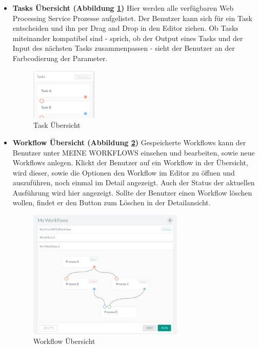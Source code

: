 \begin{itemize}
            \item \textbf{Tasks Übersicht (Abbildung \ref{fig:Tasks_Uebersicht})} \newline
            Hier werden alle verfügbaren \Gls{Web Processing Service} Prozesse aufgelistet. Der Benutzer kann sich für ein Task entscheiden und ihn per \Gls{Drag and Drop} in den Editor ziehen. Ob Tasks miteinander kompatibel sind - sprich, ob der Output eines Tasks und der Input des nächsten Tasks zusammenpassen - sieht der Benutzer an der Farbcodierung der Parameter.
            
            \begin{figure}[h]
            \centering
            \includegraphics[width=0.3\textwidth]{images/ui_tasks.png}
            \caption{Task Übersicht}
            \label{fig:Tasks_Uebersicht}
            \end{figure}
            
            
            \item \textbf{Workflow Übersicht (Abbildung \ref{fig:Workflow_Uebersicht})} \newline
            Gespeicherte Workflows kann der Benutzer unter MEINE WORKFLOWS einsehen und bearbeiten, sowie neue Workflows anlegen. Klickt der Benutzer auf ein Workflow in der Übersicht, wird dieser, sowie die Optionen den Workflow im Editor zu öffnen und auszuführen, noch einmal im Detail angezeigt. Auch der Status der aktuellen Ausführung wird hier angezeigt. Sollte der Benutzer einen Workflow löschen wollen, findet er den Button zum Löschen in der Detailansicht.
            
            \begin{figure}[h]
            \centering
            \includegraphics[width=0.7\textwidth]{images/ui_workflow.png}
            \caption{Workflow Übersicht}
            \label{fig:Workflow_Uebersicht}
            \end{figure}

        \end{itemize}
        
